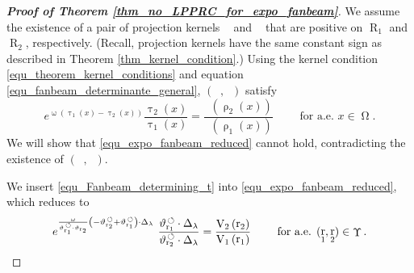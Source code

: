 \documentclass[12pt]{article}
\DeclareMathOperator{\projvariable}{i}
\DeclareMathOperator{\Xgroundset}{\Upsilon}
\newcommand{\dd}[1]{\,\mathrm{d}{#1}}
\DeclareMathOperator{\rotated}{\,\circlearrowleft}
\DeclareMathOperator{\rayvariable}{r}
\DeclareMathOperator{\raygroundset}{R}
\DeclareMathOperator{\tinverse}{\tau}
\DeclareMathOperator{\rayinverse}{\rho}
\DeclareMathOperator{\Vone}{V_1}
\DeclareMathOperator{\Vtwo}{V_2}
\DeclareMathOperator{\attenuation}{\omega}
\DeclareMathOperator{\weightfkt}{\zeta}
\DeclareMathOperator{\imgdom}{{\Omega}}
\begin{document}
\begin{proof}[\textbf{Proof of Theorem \ref{thm_no_LPPRC_for_expo_fanbeam}}]
We assume the existence of a pair of projection kernels $\Vone$ and $\Vtwo$ that are positive on $\raygroundset_1$ and $\raygroundset_2$, respectively. (Recall, projection kernels have the same constant sign as described in Theorem \ref{thm_kernel_condition}.) Using the kernel condition \eqref{equ_theorem_kernel_conditions} and equation \eqref{equ_fanbeam_determinante_general}, $(\Vone,\Vtwo)$ satisfy
 \begin{equation} \label{equ_expo_fanbeam_reduced}
e^{{\attenuation} (\tinverse_1(x)-\tinverse_2(x))} \frac{\tinverse_2(x)}{\tinverse_1(x)} 
 =
\frac{\Vtwo\left(\rayinverse_2(x)\right)}{ \Vone\left(\rayinverse_1(x)\right)}
\qquad \text{ for a.e. }x\in \imgdom.
 \end{equation}
We will show that \eqref{equ_expo_fanbeam_reduced} cannot hold, contradicting the existence of $(\Vone,\Vtwo)$. 
 


We insert \eqref{equ_Fanbeam_determining_t} into \eqref{equ_expo_fanbeam_reduced}, which reduces to
\begin{equation}\label{equ_proof_expo_fanbeam_reduced_plugged_in}
e^{\frac{{\attenuation}}{\vartheta^{\rotated}_{\rayvariable_1} \cdot \vartheta_{\rayvariable_2}}\left( -\vartheta^{\rotated} _{\rayvariable_2} +\vartheta_{\rayvariable_1}^{\rotated} \right)\cdot \Delta_\lambda }\ \frac{\vartheta_{\rayvariable_1}^{\rotated} \cdot \Delta_\lambda }{\vartheta_{\rayvariable_2}^{\rotated} \cdot \Delta_\lambda } =\frac{\Vtwo\left(\rayvariable_2\right)}{ \Vone\left(\rayvariable_1\right)}  \hfill \qquad \text{ for a.e. }(\rayvariable_1,\rayvariable_2) \in \Xgroundset.
\end{equation}



\end{proof}
\end{document}
